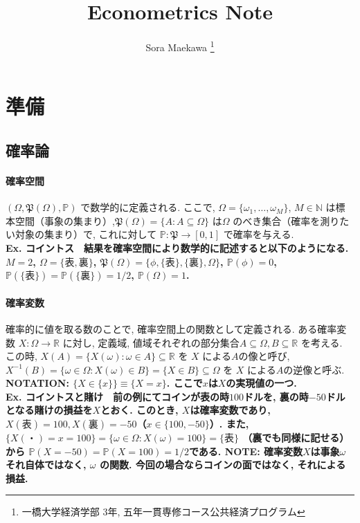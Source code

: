 \documentclass[paper=a4paper,fontsize=10pt]{jlreq}
\begin{document}
\title{Econometrics Note}
\author{
  Sora Maekawa \thanks{一橋大学経済学部 3年, 五年一貫専修コース公共経済プログラム}
}
\maketitle

\section{準備}
\subsection{確率論}
\paragraph{確率空間}
$( \Omega, \mathfrak{P} (\Omega), \mathbb{P} )$ で数学的に定義される. ここで, $ \Omega= \{\omega_1, \dots, \omega_M\} $, $M \in \mathbb{N} $ は標本空間（事象の集まり）,$\mathfrak{P} (\Omega)=\{A:A\subseteq{\Omega} \}$ は$\Omega$ のべき集合（確率を測りたい対象の集まり）で, これに対して $\mathbb{P}:\mathfrak{P}\rightarrow [0,1]$ で確率を与える.\\

\rmfamily\mcfamily\bfseries{Ex. コイントス}\mdseries　結果を確率空間により数学的に記述すると以下のようになる. $M=2$, $\Omega=\{表, 裏\}$, $\mathfrak{P}(\Omega)=\{\phi, \{表\}, \{裏\}, \Omega\}$, $\mathbb{P}(\phi)=0$, $\mathbb{P}(\{表\})=\mathbb{P}(\{裏\})=1/2$, $\mathbb{P}(\Omega)=1$.\\

\paragraph{確率変数}
確率的に値を取る数のことで, 確率空間上の関数として定義される. ある確率変数 $X:\Omega\rightarrow\mathbb{R}$ に対し, 定義域, 値域それぞれの部分集合$A\subseteq\Omega, B\subseteq\mathbb{R}$ を考える. この時, $X(A)=\{X(\omega):\omega\in A\}\subseteq \mathbb{R}$ を $X$ による$A$の像と呼び, $X^{-1}(B)=\{\omega\in \Omega:X(\omega)\in B\}=\{X\in B\}\subseteq \Omega$ を $X$ による$A$の逆像と呼ぶ. \rmfamily\mcfamily\bfseries{NOTATION}\mdseries : $ \{ X \in \{x\} \} \equiv \{ X=x \} $. ここで$x$は$X$の実現値の一つ.\\

\rmfamily\mcfamily\bfseries{Ex. コイントスと賭け}\mdseries　前の例にてコインが表の時$100$ドルを, 裏の時$-50$ドルとなる賭けの損益を$X$とおく. このとき, $X$は確率変数であり, $X(表)=100, X(裏)=-50$（$x\in\{100, -50\}$）. また, $\{X(・) = x = 100\}=\{\omega\in\Omega:X(\omega)=100\}=\{表\}$ （裏でも同様に記せる）から $\mathbb{P}(X=-50)=\mathbb{P}(X=100)=1/2$である. \rmfamily\mcfamily\bfseries{NOTE}\mdseries : 確率変数$X$は事象$\omega$それ自体ではなく, $\omega$ の関数. 今回の場合ならコインの面ではなく, それによる損益.\\
\end{document}
